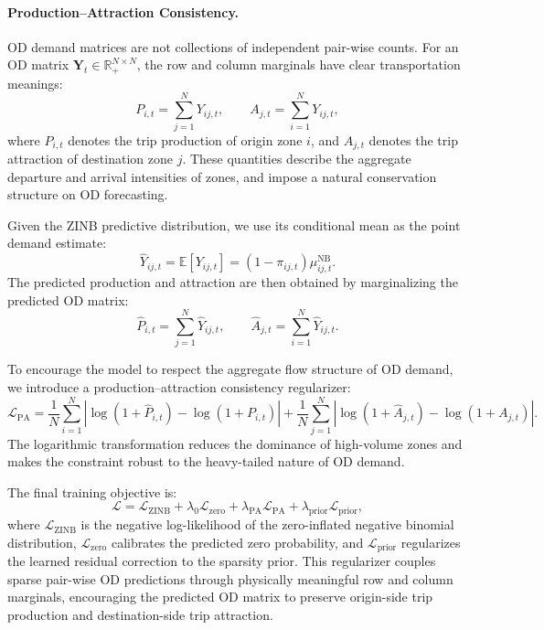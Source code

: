\paragraph{Production--Attraction Consistency.}
OD demand matrices are not collections of independent pair-wise counts. 
For an OD matrix $\mathbf{Y}_t \in \mathbb{R}_{+}^{N \times N}$, the row and column marginals have clear transportation meanings:
\begin{equation}
P_{i,t} = \sum_{j=1}^{N} Y_{ij,t}, 
\qquad
A_{j,t} = \sum_{i=1}^{N} Y_{ij,t},
\end{equation}
where $P_{i,t}$ denotes the trip production of origin zone $i$, and $A_{j,t}$ denotes the trip attraction of destination zone $j$. 
These quantities describe the aggregate departure and arrival intensities of zones, and impose a natural conservation structure on OD forecasting.

Given the ZINB predictive distribution, we use its conditional mean as the point demand estimate:
\begin{equation}
\widehat{Y}_{ij,t}
=
\mathbb{E}[Y_{ij,t}]
=
(1-\pi_{ij,t})\mu^{\mathrm{NB}}_{ij,t}.
\end{equation}
The predicted production and attraction are then obtained by marginalizing the predicted OD matrix:
\begin{equation}
\widehat{P}_{i,t} = \sum_{j=1}^{N} \widehat{Y}_{ij,t},
\qquad
\widehat{A}_{j,t} = \sum_{i=1}^{N} \widehat{Y}_{ij,t}.
\end{equation}

To encourage the model to respect the aggregate flow structure of OD demand, we introduce a production--attraction consistency regularizer:
\begin{equation}
\mathcal{L}_{\mathrm{PA}}
=
\frac{1}{N}\sum_{i=1}^{N}
\left|
\log(1+\widehat{P}_{i,t})
-
\log(1+P_{i,t})
\right|
+
\frac{1}{N}\sum_{j=1}^{N}
\left|
\log(1+\widehat{A}_{j,t})
-
\log(1+A_{j,t})
\right|.
\end{equation}
The logarithmic transformation reduces the dominance of high-volume zones and makes the constraint robust to the heavy-tailed nature of OD demand.

The final training objective is:
\begin{equation}
\mathcal{L}
=
\mathcal{L}_{\mathrm{ZINB}}
+
\lambda_{0}\mathcal{L}_{\mathrm{zero}}
+
\lambda_{\mathrm{PA}}\mathcal{L}_{\mathrm{PA}}
+
\lambda_{\mathrm{prior}}\mathcal{L}_{\mathrm{prior}},
\end{equation}
where $\mathcal{L}_{\mathrm{ZINB}}$ is the negative log-likelihood of the zero-inflated negative binomial distribution, $\mathcal{L}_{\mathrm{zero}}$ calibrates the predicted zero probability, and $\mathcal{L}_{\mathrm{prior}}$ regularizes the learned residual correction to the sparsity prior. 
This regularizer couples sparse pair-wise OD predictions through physically meaningful row and column marginals, encouraging the predicted OD matrix to preserve origin-side trip production and destination-side trip attraction.